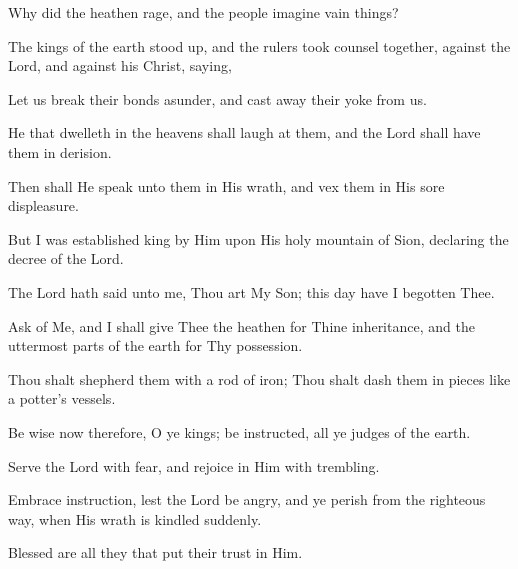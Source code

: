 Why did the heathen rage, and the people imagine vain things?

The kings of the earth stood up, and the rulers took counsel together, against the Lord, and against his Christ, saying,

Let us break their bonds asunder, and cast away their yoke from us.

He that dwelleth in the heavens shall laugh at them, and the Lord shall have them in derision.

Then shall He speak unto them in His wrath, and vex them in His sore displeasure.

But I was established king by Him upon His holy mountain of Sion, declaring the decree of the Lord.

The Lord hath said unto me, Thou art My Son; this day have I begotten Thee.

Ask of Me, and I shall give Thee the heathen for Thine inheritance, and the uttermost parts of the earth for Thy possession.

Thou shalt shepherd them with a rod of iron; Thou shalt dash them in pieces like a potter's vessels.

Be wise now therefore, O ye kings; be instructed, all ye judges of the earth.

Serve the Lord with fear, and rejoice in Him with trembling.

Embrace instruction, lest the Lord be angry, and ye perish from the righteous way, when His wrath is kindled suddenly.

Blessed are all they that put their trust in Him.
